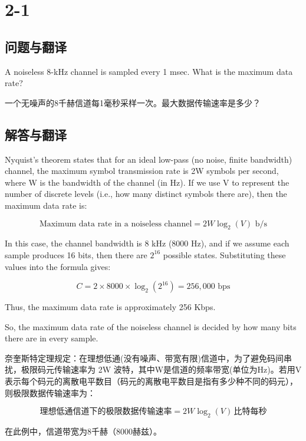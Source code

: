 
\section{2-1}

\subsection{问题与翻译}

A noiseless 8-kHz channel is sampled every 1 msec. What is the maximum data rate?

一个无噪声的8千赫信道每1毫秒采样一次。最大数据传输速率是多少？

\subsection{解答与翻译}

Nyquist’s theorem states that for an ideal low-pass (no noise, finite bandwidth) channel, the maximum symbol transmission rate is 2W symbols per second, where W is the bandwidth of the channel (in Hz). If we use V to represent the number of discrete levels (i.e., how many distinct symbols there are), then the maximum data rate is:

\[
  \text{Maximum data rate in a noiseless channel} = 2W \log_2(V) \text{ b/s}
\]

In this case, the channel bandwidth is 8 kHz (8000 Hz), and if we assume each sample produces 16 bits, then there are \(2^{16}\) possible states. Substituting these values into the formula gives:

\[
C = 2 \times 8000 \times \log_2(2^{16}) = 256,000 \text{ bps}
\]

Thus, the maximum data rate is approximately 256 Kbps.

So, the maximum data rate of the noiseless channel is decided by how many bits there are in every sample.

\vspace{10pt}

奈奎斯特定理规定：在理想低通(没有噪声、带宽有限)信道中，为了避免码间串扰，极限码元传输速率为 2W 波特，其中W是信道的频率带宽(单位为Hz)。若用V表示每个码元的离散电平数目（码元的离散电平数目是指有多少种不同的码元），则极限数据传输速率为：

\[
  \text{理想低通信道下的极限数据传输速率} = 2W \log_2(V) \, \text{比特每秒}
\]

在此例中，信道带宽为8千赫（8000赫兹）。

